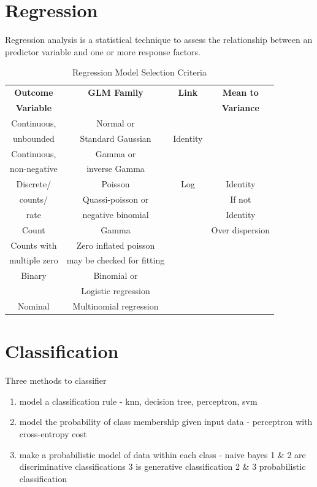 \documentclass{beamer}
\begin{document}
\section{Regression}
\begin{frame}
	Regression analysis is a statistical technique to assess the relationship between an predictor variable and one or more response factors.
\end{frame}



\begin{frame}[plain]%
\begin{table}[h]
	\centering
	\begin{tabular}{cccc}
	\textbf{Outcome} & \textbf{GLM Family} & \textbf{Link} & \textbf{Mean to} \\
	\textbf{Variable} & & & \textbf{Variance} \\ 
	\hline %
	Continuous, & Normal or & \\ unbounded & Standard Gaussian & Identity &  \\  
	\hline
	Continuous, & Gamma or & \\ non-negative & inverse Gamma &  &  \\ \hline
	
	
	Discrete/ & Poisson & Log & Identity \\
	counts/ & Quassi-poisson or &  & If not \\
	rate & negative binomial & & Identity \\
	
	
	\hline
	
	Count & Gamma &  & Over dispersion \\ \hline
	Counts with & Zero inflated poisson & \\ multiple zero & may be checked 
	for fitting & & \\ \hline
	Binary & Binomial or & \\  & Logistic regression & & \\ \hline
	Nominal  & Multinomial regression & \\
	\hline
	\end{tabular} 
\caption{Regression Model Selection Criteria}
\end{table}
\end{frame}



\section{Classification}
\begin{frame}
	Three methods to classifier
	\begin{enumerate}
		\item model a classification rule - knn, decision tree, perceptron, svm
		\item model the probability of class membership given input data - perceptron with cross-entropy cost
		\item make a probabilistic model of data within each class - naive bayes
		1 \& 2 are discriminative classifications
		3 is generative classification
		2 \& 3 probabilistic classification
	\end{enumerate}
\end{frame}
\end{document}
